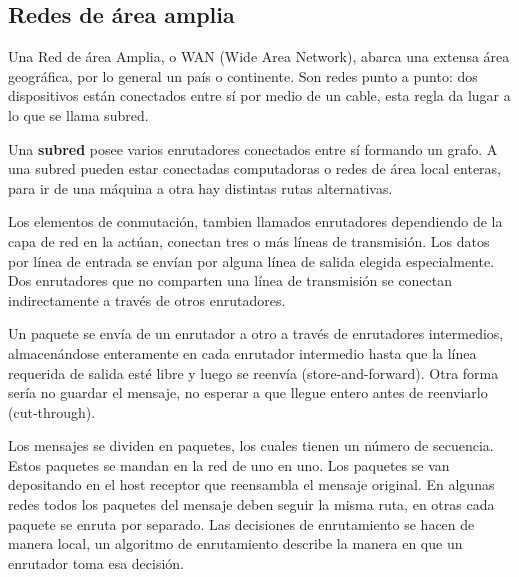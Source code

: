 \documentclass[10pt,a4paper]{report}
\begin{document}
\subsection{Redes de área amplia}
\par Una Red de área Amplia, o WAN (Wide Area Network), abarca una extensa área 
geográfica, por lo general un país o continente. Son redes punto a punto: dos 
dispositivos están conectados entre sí por medio de un cable, esta regla da lugar a lo 
que se llama subred.
\par Una \textbf{subred} posee varios enrutadores conectados entre sí formando un 
grafo. A una subred pueden estar conectadas computadoras o redes de área local 
enteras, para ir de una máquina a otra hay distintas rutas alternativas.
\par Los elementos de conmutación, tambien llamados enrutadores dependiendo de la capa de red en la actúan, conectan tres o más líneas de transmisión. Los datos por línea de entrada se envían por alguna línea de salida elegida especialmente.
Dos enrutadores que no comparten una línea de transmisión se conectan indirectamente a través de otros enrutadores.

Un paquete se envía de un enrutador a otro a través de enrutadores intermedios, almacenándose enteramente en cada enrutador intermedio hasta que la línea requerida de salida esté libre y luego se reenvía (store-and-forward). Otra forma sería no guardar el mensaje, no esperar a que llegue entero antes de reenviarlo (cut-through).

Los mensajes se dividen en paquetes, los cuales tienen un número de secuencia. Estos paquetes se mandan en la red de uno en uno. Los paquetes se van depositando en el host receptor que reensambla el mensaje original. En algunas redes todos los paquetes del mensaje deben seguir la misma ruta, en otras cada paquete se enruta por separado. Las decisiones de enrutamiento se hacen de manera local, un algoritmo de enrutamiento describe la manera en que un enrutador toma esa decisión.
\end{document}
